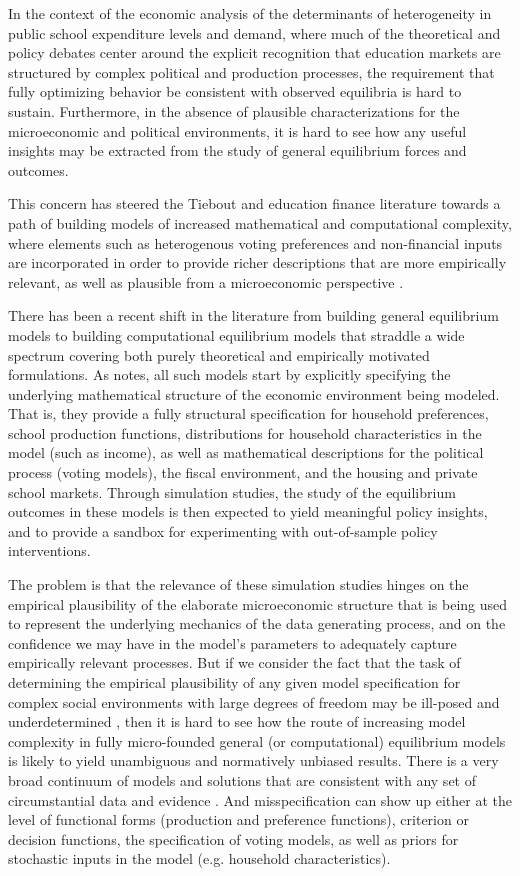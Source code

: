 In the context of the economic analysis of the determinants of
heterogeneity in public school expenditure levels and demand, where
much of the theoretical and policy debates center around the explicit
recognition that education markets are structured by complex political
and production processes, the requirement that fully optimizing
behavior be consistent with observed equilibria is hard to
sustain. Furthermore, in the absence of plausible characterizations
for the microeconomic and political environments, it is hard to see
how any useful insights may be extracted from the study of general
equilibrium forces and outcomes.

This concern has steered the Tiebout and education finance literature
towards a path of building models of increased mathematical and
computational complexity, where elements such as heterogenous voting
preferences and non-financial inputs are incorporated in order to
provide richer descriptions that are more empirically relevant, as
well as plausible from a microeconomic perspective
\citep{nechyba_school_2003, tim}.

There has been a recent shift in the literature from building general
equilibrium models to building computational equilibrium models that
straddle a wide spectrum covering both purely theoretical and
empirically motivated formulations.  As \citet{nechyba_tiebout_2020}
notes, all such models start by explicitly specifying the underlying
mathematical structure of the economic environment being modeled. That
is, they provide a fully structural specification for household
preferences, school production functions, distributions for household
characteristics in the model (such as income), as well as mathematical
descriptions for the political process (voting models), the fiscal
environment, and the housing and private school markets. Through
simulation studies, the study of the equilibrium outcomes in these
models is then expected to yield meaningful policy insights, and to
provide a sandbox for experimenting with out-of-sample policy
interventions.

The problem is that the relevance of these simulation
studies hinges on the empirical plausibility of the elaborate
microeconomic structure that is being used to represent the underlying
mechanics of the data generating process, and on the confidence we may
have in the model's parameters to adequately capture empirically
relevant processes. But if we consider the fact that the task of
determining the empirical plausibility of any given model
specification for complex social environments with large degrees of
freedom may be ill-posed and underdetermined \citep{schafol}, then
it is hard to see how the route of increasing model complexity in
fully micro-founded general (or computational) equilibrium models is
likely to yield unambiguous and normatively unbiased results. There is
a very broad continuum of models and solutions that are consistent
with any set of circumstantial data and evidence
\citep{golan_foundations}. And misspecification can show up either
at the level of functional forms (production and preference
functions), criterion or decision functions, the specification of
voting models, as well as priors for stochastic inputs in the model
(e.g. household characteristics).

